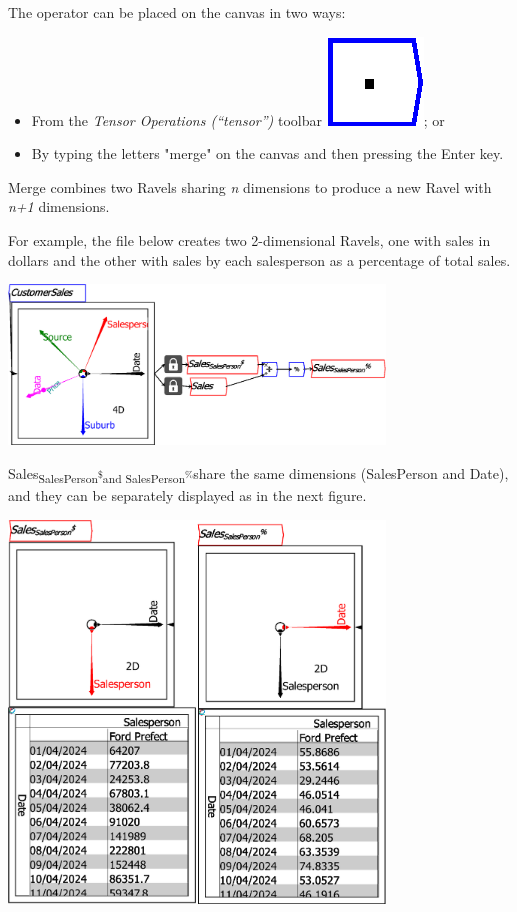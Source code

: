 The operator can be placed on the canvas in two ways:
\begin{itemize}
\item From the \emph{Tensor Operations (``tensor'')} toolbar \includegraphics{images/innerProduct};
or 
\item By typing the letters "merge" on the canvas and then pressing the
Enter key.
\end{itemize}
Merge combines two Ravels sharing \emph{n} dimensions to produce a
new Ravel with \emph{n+1} dimensions.

For example, the file below creates two 2-dimensional Ravels, one
with sales in dollars and the other with sales by each salesperson
as a percentage of total sales.

\includegraphics[width=10cm]{images/MergeExample01TwoVariables}

Sales\textsubscript{SalesPerson\textsuperscript{\$}and SalesPerson\textsuperscript{\%}}share
the same dimensions (SalesPerson and Date), and they can be separately
displayed as in the next figure.

\includegraphics[width=10cm]{images/MergeExample02TwoVariablesSeparate}

